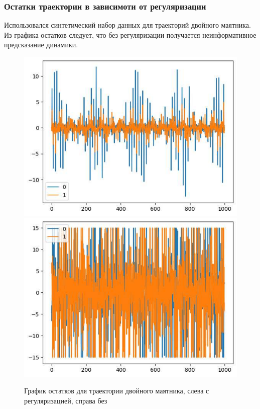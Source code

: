 \documentclass{beamer}
\begin{document}
\begin{frame}
\frametitle{Остатки траектории в зависимоти от регуляризации}

Использовался синтетический набор данных для траекторий двойного маятника. Из графика остатков следует, что без регуляризации получается неинформативное предсказание динамики.

\begin{figure}[H]
 \centering
 \includegraphics[scale = 0.37]{output_resid_5.pdf}
 \includegraphics[scale = 0.37]{output_resid_0.pdf}
 \caption{График остатков для траектории двойного маятника, слева с регуляризацией, справа без}
 \label{fig: trajectory3}
\end{figure}

\end{frame}
\end{document}
